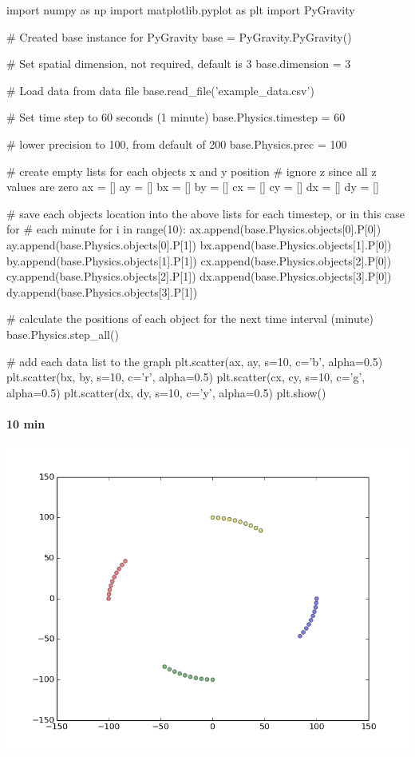 \documentclass[15pt]{report}
\begin{document}
\begin{code}
import numpy as np
import matplotlib.pyplot as plt
import PyGravity

# Created base instance for PyGravity
base = PyGravity.PyGravity()

# Set spatial dimension, not required, default is 3  
base.dimension = 3

# Load data from data file
base.read_file('example_data.csv')

# Set time step to 60 seconds (1 minute)
base.Physics.timestep = 60

# lower precision to 100, from default of 200
base.Physics.prec = 100

# create empty lists for each objects x and y position
# ignore z since all z values are zero
ax = []
ay = []
bx = []
by = []
cx = []
cy = []
dx = []
dy = []

# save each objects location into the above lists  for each timestep, or in this case for 
# each minute
for i in range(10):
    ax.append(base.Physics.objects[0].P[0])
    ay.append(base.Physics.objects[0].P[1])
    bx.append(base.Physics.objects[1].P[0])
    by.append(base.Physics.objects[1].P[1])
    cx.append(base.Physics.objects[2].P[0])
    cy.append(base.Physics.objects[2].P[1])
    dx.append(base.Physics.objects[3].P[0])
    dy.append(base.Physics.objects[3].P[1])

	# calculate the positions of each object for the next time interval (minute)
    base.Physics.step_all()
   
# add each data list to the graph
plt.scatter(ax, ay, s=10, c='b', alpha=0.5)
plt.scatter(bx, by, s=10, c='r', alpha=0.5)
plt.scatter(cx, cy, s=10, c='g', alpha=0.5)
plt.scatter(dx, dy, s=10, c='y', alpha=0.5)
plt.show()

\end{code}

\paragraph{10 min}
\centerline{\includegraphics[scale=0.3]{ex1_1}}
\end{document}
